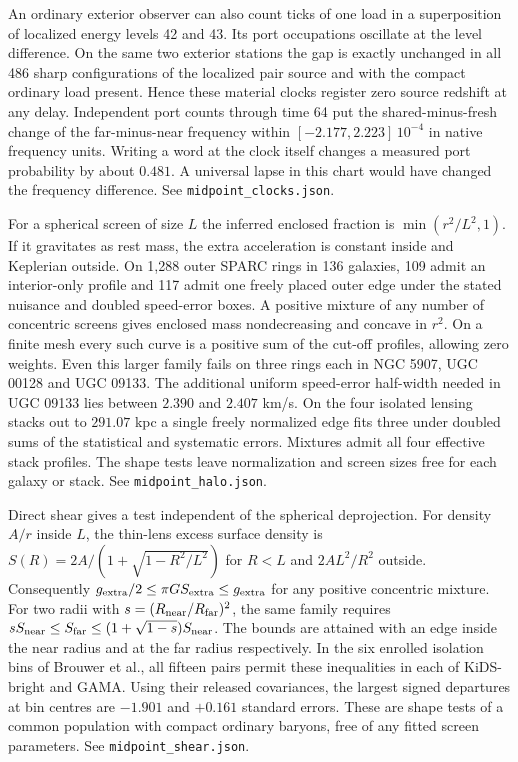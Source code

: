\documentclass[11pt]{article}
\begin{document}
An ordinary exterior observer can also count ticks of one load in a
superposition of localized energy levels 42 and 43. Its port occupations
oscillate at the level difference. On the same two exterior stations
the gap is exactly unchanged in all 486 sharp configurations of the
localized pair source and with the compact ordinary load present.
Hence these material clocks register zero source redshift at any delay.
Independent port counts through time 64 put the shared-minus-fresh
change of the far-minus-near frequency within
\([-2.177,2.223]\,10^{-4}\) in native frequency units. Writing a word
at the clock itself changes a measured port probability by about
\(0.481\). A universal lapse in this chart would have changed the
frequency difference. See \texttt{midpoint\_clocks.json}.

For a spherical screen of size \(L\) the inferred enclosed fraction
is \(\min(r^2/L^2,1)\). If it gravitates as rest mass, the extra
acceleration is constant inside and Keplerian outside. On 1,288
outer SPARC rings in 136 galaxies, 109 admit an interior-only profile
and 117 admit one freely placed outer edge under the stated nuisance
and doubled speed-error boxes. A positive mixture of any number
of concentric screens gives enclosed mass nondecreasing and concave
in \(r^2\). On a finite mesh every such curve is a positive sum of
the cut-off profiles, allowing zero weights. Even this larger family
fails on three rings each in NGC 5907, UGC 00128 and UGC 09133. The
additional uniform speed-error half-width needed in UGC 09133 lies
between \(2.390\) and \(2.407\) km/s. On the four isolated lensing
stacks out to \(291.07\) kpc a single freely normalized edge fits
three under doubled sums of the statistical and systematic errors.
Mixtures admit all four effective stack profiles. The shape tests
leave normalization and screen sizes free for each galaxy or stack.
See \texttt{midpoint\_halo.json}.

Direct shear gives a test independent of the spherical deprojection.
For density \(A/r\) inside \(L\), the thin-lens excess surface density
is \(S(R)=2A/(1+\sqrt{1-R^2/L^2})\) for \(R<L\) and
\(2AL^2/R^2\) outside. Consequently \(g_{\rm extra}/2\le\pi G
S_{\rm extra}\le g_{\rm extra}\) for any positive concentric mixture.
For two radii with \(s=(R_{\rm near}/R_{\rm far})^2\), the same
family requires \(s S_{\rm near}\le S_{\rm far}\le
(1+\sqrt{1-s})S_{\rm near}\). The bounds are attained with an edge
inside the near radius and at the far radius respectively. In the
six enrolled isolation bins of Brouwer et al., all fifteen
pairs permit these inequalities in each of KiDS-bright and GAMA.
Using their released covariances, the largest signed departures at
bin centres are \(-1.901\) and \(+0.161\) standard errors. These
are shape tests of a common population with compact ordinary baryons,
free of any fitted screen parameters. See \texttt{midpoint\_shear.json}.
\end{document}
